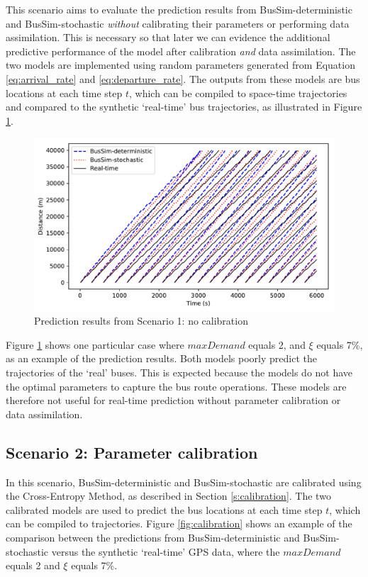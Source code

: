 This scenario aims to evaluate the prediction results from BusSim-deterministic and BusSim-stochastic \textit{without} calibrating their parameters or performing data assimilation. This is necessary so that later we can evidence the additional predictive performance of the model after calibration \textit{and} data assimilation. The two models are implemented using random parameters generated from Equation \ref{eq:arrival_rate} and \ref{eq:departure_rate}. The outputs from these models are bus locations at each time step $t$, which can be compiled to space-time trajectories and compared to the synthetic `real-time' bus trajectories, as illustrated in Figure \ref{fig:do_nothing}. 

\begin{figure}[h]
    \centering
    \includegraphics[width=1\textwidth]{Figures/Fig_do_nothing_IncreaseRate_7.pdf}
    \caption{Prediction results from Scenario 1: no calibration}
    \label{fig:do_nothing}
\end{figure}

Figure \ref{fig:do_nothing} shows one particular case where $maxDemand$ equals 2, and $\xi$ equals 7\%, as an example of the prediction results. Both models poorly predict the trajectories of the `real' buses. This is expected because the models do not have the optimal parameters to capture the bus route operations. These models are therefore not useful for real-time prediction without parameter calibration or data assimilation. 

\subsection{Scenario 2: Parameter calibration}

In this scenario, BusSim-deterministic and BusSim-stochastic are calibrated using the Cross-Entropy Method, as described in Section \ref{s:calibration}. The two calibrated models are used to predict the bus locations at each time step $t$, which can be compiled to trajectories. Figure \ref{fig:calibration} shows an example of the comparison between the predictions from BusSim-deterministic and BusSim-stochastic versus the synthetic `real-time' GPS data, where the $maxDemand$ equals 2 and $\xi$ equals 7\%. 

